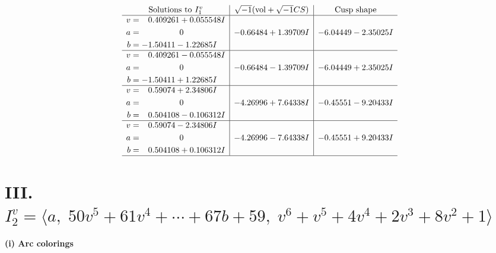 \documentclass[1p]{elsarticle_modified}
\theoremstyle{definition}
\newcommand{\I}{\sqrt{-1}}
\begin{document}
$$\begin{array}{c|c|c}  
\text{Solutions to }I^v_{1}& \I (\text{vol} + \sqrt{-1}CS) & \text{Cusp shape}\\
 \hline 
\begin{aligned}
v &= \phantom{-}0.409261 + 0.055548 I \\
a &= \phantom{-0.000000 } 0 \\
b &= -1.50411 - 1.22685 I\end{aligned}
 & -0.66484 + 1.39709 I & -6.04449 - 2.35025 I \\ \hline\begin{aligned}
v &= \phantom{-}0.409261 - 0.055548 I \\
a &= \phantom{-0.000000 } 0 \\
b &= -1.50411 + 1.22685 I\end{aligned}
 & -0.66484 - 1.39709 I & -6.04449 + 2.35025 I \\ \hline\begin{aligned}
v &= \phantom{-}0.59074 + 2.34806 I \\
a &= \phantom{-0.000000 } 0 \\
b &= \phantom{-}0.504108 - 0.106312 I\end{aligned}
 & -4.26996 + 7.64338 I & -0.45551 - 9.20433 I \\ \hline\begin{aligned}
v &= \phantom{-}0.59074 - 2.34806 I \\
a &= \phantom{-0.000000 } 0 \\
b &= \phantom{-}0.504108 + 0.106312 I\end{aligned}
 & -4.26996 - 7.64338 I & -0.45551 + 9.20433 I\\
 \hline 
 \end{array}$$\newpage\newpage\renewcommand{\arraystretch}{1}
\centering \section*{III. $I^v_{2}= \langle a,\;50 v^5+61 v^4+\cdots+67 b+59,\;v^6+v^5+4 v^4+2 v^3+8 v^2+1 \rangle$}
\flushleft \textbf{(i) Arc colorings}\\
\end{document}
